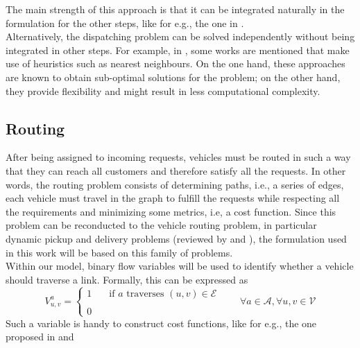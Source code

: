  The main strength of this approach is that it can be integrated naturally in the formulation for the other steps, like for e.g., the one in . \\
Alternatively, the dispatching problem can be solved independently without being integrated in other steps. For example, in , some works are mentioned that make use of heuristics such as nearest neighbours. On the one hand, these approaches are known to obtain sub-optimal solutions for the problem; on the other hand, they provide flexibility and might result in less computational complexity. \\


\subsection{Routing}\label{sec:routing}
After being assigned to incoming requests, vehicles must be routed in such a way that they can reach all customers and therefore satisfy all the requests. In other words, the routing problem consists of determining paths, i.e., a series of edges, each vehicle must travel in the graph to fulfill the requests while respecting all the requirements and minimizing some metrics, i.e, a cost function. Since this problem can be reconducted to the
vehicle routing problem, in particular dynamic pickup and delivery problems (reviewed by  and ), the formulation used in this work will be based on this family of problems. \\
Within our model, binary flow variables will be used to identify whether a vehicle should traverse a link. Formally, this can be expressed as 
\begin{equation*}
	V_{u,v}^a = 
	\begin{cases} 
		1 & \quad \text{if $a$ traverses } (u,v) \in \mathcal{E}\\
		\\
		0
	\end{cases}
	\quad\quad \forall a \in \mathcal{A}, \forall u,v \in \mathcal{V}
	\label{eq:binary_edges}
\end{equation*}
Such a variable is handy to construct cost functions, like for e.g., the one proposed in  and 

